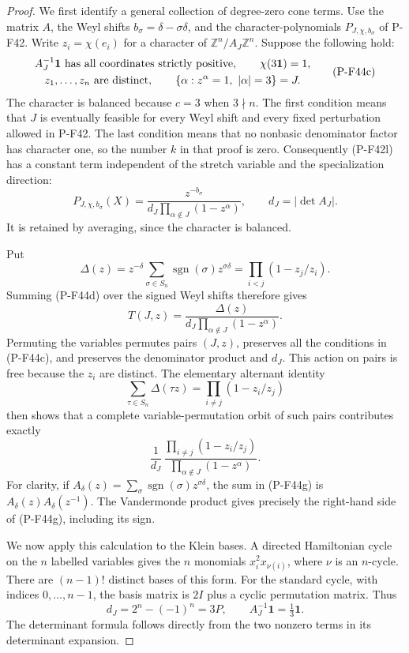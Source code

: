 \begin{proof}
We first identify a general collection of degree-zero cone terms.
Use the matrix $A$, the Weyl shifts $b_\sigma=\delta-\sigma\delta$,
and the character-polynomials $P_{J,\chi,b_\sigma}$ of P-F42.
Write $z_i=\chi(e_i)$ for a character of
$\mathbb Z^n/A_J\mathbb Z^n$.
Suppose the following hold:
\[
 \begin{gathered}
 A_J^{-1}\mathbf1\ \hbox{has all coordinates strictly positive},
 \qquad \chi(3\mathbf1)=1,\\
 z_1,\ldots,z_n\ \hbox{are distinct},\qquad
 \{\alpha:z^\alpha=1,\ |\alpha|=3\}=J.
 \end{gathered}
 \tag{P-F44c}
\]
The character is balanced because $c=3$ when $3\nmid n$.
The first condition means that $J$ is eventually feasible
for every Weyl shift and every fixed perturbation allowed
in P-F42. The last condition means that no nonbasic
denominator factor has character one, so the number $k$
in that proof is zero.
Consequently (P-F42l) has a constant term independent of
the stretch variable and the specialization direction:
\[
 P_{J,\chi,b_\sigma}(X)=
 \frac{z^{-b_\sigma}}
 {d_J\prod_{\alpha\notin J}(1-z^\alpha)},\qquad
 d_J=|\det A_J|.
 \tag{P-F44d}
\]
It is retained by averaging, since the character is balanced.

Put
\[
 \Delta(z)=z^{-\delta}
                  \sum_{\sigma\in S_n}
                         \operatorname{sgn}(\sigma)z^{\sigma\delta}
          =\prod_{i<j}(1-z_j/z_i).
 \tag{P-F44e}
\]
Summing (P-F44d) over the signed Weyl shifts therefore gives
\[
 T(J,z)=
 \frac{\Delta(z)}
 {d_J\prod_{\alpha\notin J}(1-z^\alpha)}.
 \tag{P-F44f}
\]
Permuting the variables permutes pairs $(J,z)$, preserves
all the conditions in (P-F44c), and preserves the denominator
product and $d_J$. This action on pairs is free because the
$z_i$ are distinct.
The elementary alternant identity
\[
 \sum_{\tau\in S_n}\Delta(\tau z)
       =\prod_{i\ne j}(1-z_i/z_j)
 \tag{P-F44g}
\]
then shows that a complete variable-permutation orbit of
such pairs contributes exactly
\[
 \frac1{d_J}\,
 \frac{\prod_{i\ne j}(1-z_i/z_j)}
      {\prod_{\alpha\notin J}(1-z^\alpha)}.
 \tag{P-F44h}
\]
For clarity, if
$A_\delta(z)=\sum_\sigma\operatorname{sgn}(\sigma)
z^{\sigma\delta}$, the sum in (P-F44g) is
$A_\delta(z)A_\delta(z^{-1})$.
The Vandermonde product gives precisely the right-hand
side of (P-F44g), including its sign.

We now apply this calculation to the Klein bases.
A directed Hamiltonian cycle on the $n$ labelled variables
gives the $n$ monomials $x_i^2x_{\nu(i)}$, where $\nu$ is
an $n$-cycle. There are $(n-1)!$ distinct bases of this
form. For the standard cycle, with indices $0,\ldots,n-1$,
the basis matrix is $2I$ plus a cyclic permutation matrix.
Thus
\[
 d_J=2^n-(-1)^n=3P,\qquad
                  A_J^{-1}\mathbf1=\tfrac13\mathbf1.
 \tag{P-F44i}
\]
The determinant formula follows directly from the two
nonzero terms in its determinant expansion.


\end{proof}
